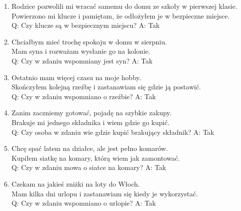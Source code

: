 \begin{enumerate}
	Q: Czy kot był powierzony przez sąsiada? A: Tak
\item Rodzice pozwolili mi wracać samemu do domu ze szkoły w pierwszej klasie.\\
	Powierzono mi klucze i pamiętam, że odłożyłem je w bezpieczne miejsce.\\
	Q: Czy klucze są w bezpiecznym miejscu? A: Tak
\item Chciałbym mieć trochę spokoju w domu w sierpniu.\\
	Mam syna i rozważam wysłanie go na kolonie.\\
	Q: Czy w zdaniu wspomniany jest syn? A: Tak
\item Ostatnio mam więcej czasu na moje hobby.\\
	Skończyłem kolejną rzeźbę i zastanawiam się gdzie ją postawić.\\
	Q: Czy w zdaniu wspomniano o rzeźbie? A: Tak
\item Zanim zaczniemy gotować, pojadę na szybkie zakupy.\\
	Brakuje mi jednego składnika i wiem gdzie go kupić.\\
	Q: Czy osoba w zdaniu wie gdzie kupić brakujący składnik? A: Tak
\item Chcę spać latem na działce, ale jest pełno komarów.\\
	Kupiłem siatkę na komary, którą wiem jak zamontować.\\
	Q: Czy w zdaniu mowa o siatce na komary? A: Tak
\item Czekam na jakieś zniżki na loty do Włoch.\\
	Mam kilka dni urlopu i zastanawiam się kiedy je wykorzystać.\\
	Q: Czy w zdaniu wspomniano o urlopie? A: Tak
\end{enumerate}


